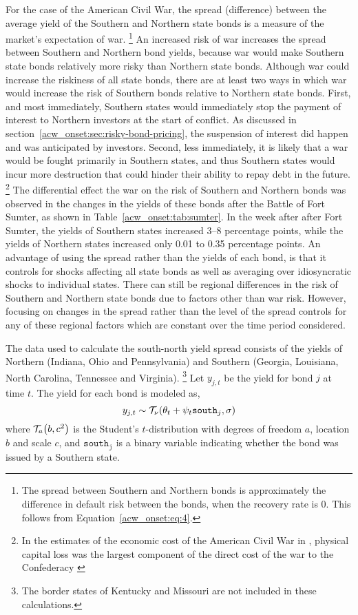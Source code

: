 For the case of the American Civil War, the spread (difference) between the average yield of the Southern and Northern state bonds is a measure of the market's expectation of war.%
\footnote{
  The spread between Southern and Northern bonds is approximately the difference in default risk between the bonds, when the recovery rate is 0.
  This follows from Equation~\eqref{acw_onset:eq:4}.
}
An increased risk of war increases the spread between Southern and Northern bond yields, because war would make Southern state bonds relatively more risky than Northern state bonds.
Although war could increase the riskiness of all state bonds, there are at least two ways in which war would increase the risk of Southern bonds relative to Northern state bonds.
First, and most immediately, Southern states would immediately stop the payment of interest to Northern investors at the start of conflict.
As discussed in section~\ref{acw_onset:sec:risky-bond-pricing}, the suspension of interest did happen and was anticipated by investors.
Second, less immediately, it is likely that a war would be fought primarily in Southern states, and thus Southern states would incur more destruction that could hinder their ability to repay debt in the future.%
\footnote{In the estimates of the economic cost of the American Civil War in \textcite{GoldinLewis1975}, physical capital loss was the largest component of the direct cost of the war to the Confederacy \parencite[308]{GoldinLewis1975}}
The differential effect the war on the risk of Southern and Northern bonds was observed in the changes in the yields of these bonds after the Battle of Fort Sumter, as shown in Table~\ref{acw_onset:tab:sumter}.
In the week after after Fort Sumter, the yields of Southern states increased 3--8 percentage points, while the yields of Northern states increased only 0.01 to 0.35 percentage points.
An advantage of using the spread rather than the yields of each bond, is that it controls for shocks affecting all state bonds as well as averaging over idiosyncratic shocks to individual states.
There can still be regional differences in the risk of Southern and Northern state bonds due to factors other than war risk.
However, focusing on changes in the spread rather than the level of the spread controls for any of these regional factors which are constant over the time period considered.

The data used to calculate the south-north yield spread consists of the yields of Northern (Indiana, Ohio and Pennsylvania) and Southern (Georgia, Louisiana, North Carolina, Tennessee and Virginia).
\footnote{The border states of Kentucky and Missouri are not included in these calculations.}
Let $y_{j,t}$ be the yield for bond $j$ at time $t$.
The yield for each bond is modeled as,
\begin{equation}
  y_{j,t} \sim \mathcal{T}_{\nu}\mathopen{}\left(\theta_{t} + \psi_{t} \mathtt{south}_{j}, \sigma\right)\mathclose{}
\end{equation}
where $\mathcal{T}_{a}\mathopen{}\left(b, c^{2}\right)\mathclose{}$ is the Student's $t$-distribution with degrees of freedom $a$, location $b$ and scale $c$, and
$\mathtt{south_{j}}$ is a binary variable indicating whether the bond was issued by a Southern state.

